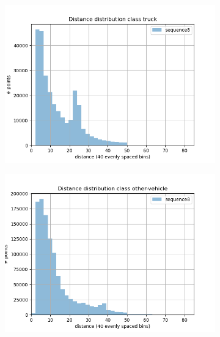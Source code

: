 \begin{figure}[h]
\begin{subfigure}[b]{0.24\textwidth}
         \includegraphics[width=\textwidth]{Figures/Chapter4/dist-height/dist/test/class4.png}
     \end{subfigure}
     \hfill
     \begin{subfigure}[b]{0.24\textwidth}
         \centering
         \includegraphics[width=\textwidth]{Figures/Chapter4/dist-height/dist/test/class5.png}
     \end{subfigure}
     \begin{subfigure}[b]{0.24\textwidth}
         \centering

\end{subfigure}
\end{figure}
